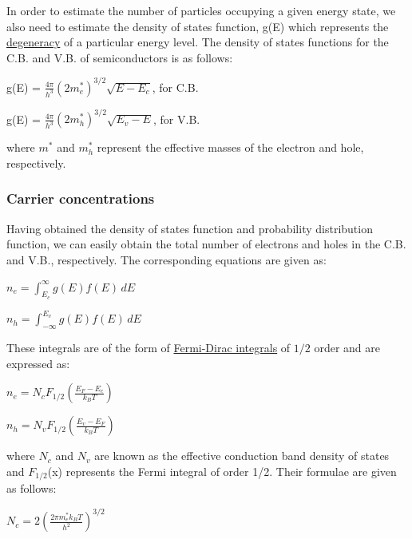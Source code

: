 \documentclass[12 pt]{article}
\begin{document}
In order to estimate the number of particles occupying a given energy state, we also need to estimate the density of states function, g(E) which represents the \href{https://en.wikipedia.org/wiki/Degenerate_energy_levels}{degeneracy} of a particular energy level. The density of states functions for the C.B. and V.B. of semiconductors is as follows:
\begin{center}
    g(E) = $\frac{4\pi}{h^{3}}(2m_{e}^{*})^{3/2}\sqrt{E-E_{c}}$, for C.B.
\end{center}

\begin{center}
    g(E) = $\frac{4\pi}{h^{3}}(2m_{h}^{*})^{3/2}\sqrt{E_{v}-E}$, for V.B.
\end{center}
where $m^{*}$ and $m_{h}^{*}$ represent the effective masses of the electron and hole, respectively.

\subsubsection{Carrier concentrations}
Having obtained the density of states function and probability distribution function, we can easily obtain the total number of electrons and holes in the C.B. and V.B., respectively. The corresponding equations are given as:
\begin{center}
    $n_{e} =  \int_{E_{c}}^{\infty} g(E)f(E) \,dE \ $
\end{center}

\begin{center}
    $n_{h} =  \int_{-\infty}^{E_{v}} g(E)f(E) \,dE \ $
\end{center}

These integrals are of the form of \href{https://en.wikipedia.org/wiki/Complete_Fermi%E2%80%93Dirac_integral}{Fermi-Dirac integrals} of $1/2$ order and are expressed as:
\begin{center}
    $n_{e} = N_{c}F_{1/2}(\frac{E_{F}-E_{c}}{k_{B}T})  $
\end{center}

\begin{center}
    $n_{h} = N_{v}F_{1/2}(\frac{E_{v}-E_{F}}{k_{B}T})  $
\end{center}
where $N_{c}$ and $N_{v}$ are known as the effective conduction band density of states and $F_{1/2}$(x) represents the Fermi integral of order 1/2. Their formulae are given as follows:
\begin{center}
    $N_{c} = 2(\frac{2\pi m_{e}^{*} k_{B}T}{h^{2}})^{3/2}$
\end{center}
\end{document}
